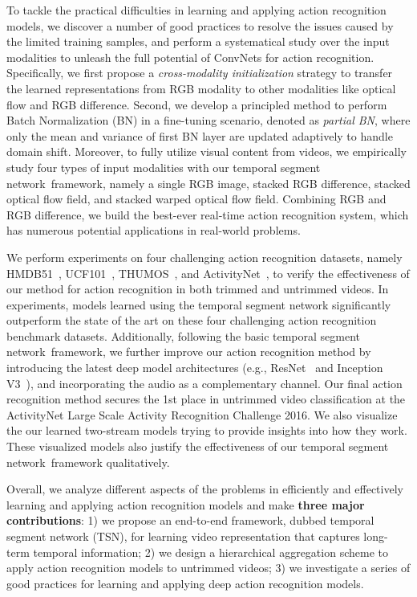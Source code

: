 \documentclass[10pt,journal,compsoc]{IEEEtran}
\newcommand{\SEGNET}{temporal segment network}
\begin{document}
To tackle the practical difficulties in learning and applying action recognition models, we discover a number of good practices to resolve the issues caused by the limited training samples, and perform a systematical study over the input modalities to unleash the full potential of ConvNets for action recognition. Specifically, we first propose a {\em cross-modality initialization} strategy to transfer the learned representations from RGB modality to other modalities like optical flow and RGB difference. Second, we develop a principled method to perform Batch Normalization (BN) in a fine-tuning scenario, denoted as {\em partial BN}, where only the mean and variance of first BN layer are updated adaptively to handle domain shift. Moreover, to fully utilize visual content from videos, we empirically study four types of input modalities with our \SEGNET~framework, namely a single RGB image, stacked RGB difference, stacked optical flow field, and stacked warped optical flow field. Combining RGB and RGB difference, we build the best-ever real-time action recognition system, which has numerous potential applications in real-world problems. 

We perform experiments on four challenging action recognition datasets, namely HMDB51~\cite{KuehneJGPS11}, UCF101~\cite{Soomro12}, THUMOS~\cite{THUMOS}, and ActivityNet~\cite{HeilbronEGN15}, to verify the effectiveness of our method for action recognition in both trimmed and untrimmed videos. In experiments, models learned using the temporal segment network significantly outperform the state of the art on these four challenging action recognition benchmark datasets. Additionally, following the basic \SEGNET~framework, we further improve our action recognition method by introducing the latest deep model architectures (e.g., ResNet~\cite{HeZRS15} and Inception V3~\cite{SzegedyVISW16}), and incorporating the audio as a complementary channel. Our final action recognition method secures the 1st place in untrimmed video classification at the ActivityNet Large Scale Activity Recognition Challenge 2016. We also visualize the our learned two-stream models trying to provide insights into how they work. These visualized models also justify the effectiveness of our \SEGNET~framework qualitatively.

Overall, we analyze different aspects of the problems in efficiently and effectively learning and applying action recognition models and make \textbf{three major contributions}: 1) we propose an end-to-end framework, dubbed temporal segment network (TSN), for learning video representation that captures long-term temporal information; 2) we design a hierarchical aggregation scheme to apply action recognition models to untrimmed videos; 3) we investigate a series of good practices for learning and applying deep action recognition models. 
\end{document}
